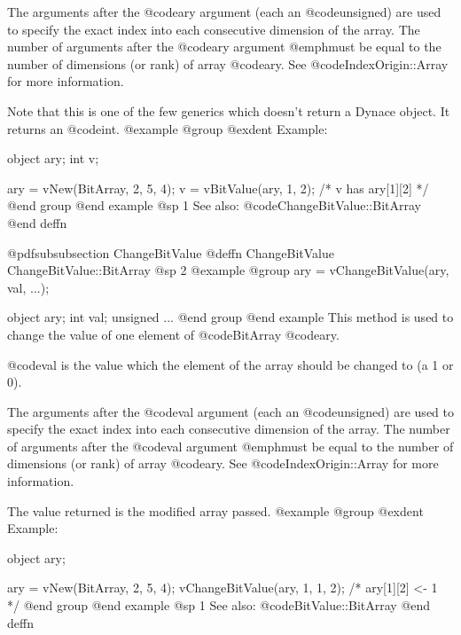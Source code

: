 The arguments after the @code{ary} argument (each an @code{unsigned})
are used to specify the exact index into each consecutive dimension of
the array.  The number of arguments after the @code{ary} argument
@emph{must} be equal to the number of dimensions (or rank) of array
@code{ary}.  See @code{IndexOrigin::Array} for more information.

Note that this is one of the few generics which doesn't return a Dynace
object.  It returns an @code{int}.
@example
@group
@exdent Example:

object  ary;
int     v;

ary = vNew(BitArray, 2, 5, 4);
v = vBitValue(ary, 1, 2);
/*  v has ary[1][2]  */
@end group
@end example
@sp 1
See also:  @code{ChangeBitValue::BitArray}
@end deffn








@pdfsubsubsection {ChangeBitValue}
@deffn {ChangeBitValue} ChangeBitValue::BitArray
@sp 2
@example
@group
ary = vChangeBitValue(ary, val, ...);

object    ary;
int       val;
unsigned  ...
@end group
@end example
This method is used to change the value of one element of
@code{BitArray} @code{ary}.

@code{val} is the value which the element of the array should be changed
to (a 1 or 0).

The arguments after the @code{val} argument (each an @code{unsigned})
are used to specify the exact index into each consecutive dimension of
the array.  The number of arguments after the @code{val} argument
@emph{must} be equal to the number of dimensions (or rank) of array
@code{ary}.  See @code{IndexOrigin::Array} for more information.

The value returned is the modified array passed.
@example
@group
@exdent Example:

object  ary;

ary = vNew(BitArray, 2, 5, 4);
vChangeBitValue(ary, 1, 1, 2);
/*  ary[1][2] <- 1  */
@end group
@end example
@sp 1
See also:  @code{BitValue::BitArray}
@end deffn









